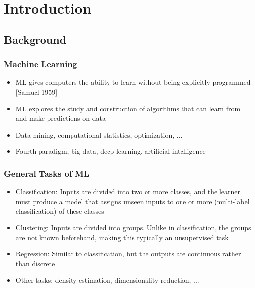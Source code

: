 
\section{Introduction}\label{sec:intro}

\subsection{Background}

\begin{frame}
  \MyLogo
  \frametitle{Machine Learning}  

\begin{itemize}

\item ML gives computers the ability to learn without being explicitly programmed {\footnotesize\color{DarkOrchid}[Samuel 1959]}

\item ML explores the study and construction of algorithms that can learn from and make predictions on data

\item Data mining, computational statistics, optimization, ...

\item Fourth paradigm, big data, deep learning, artificial intelligence 

\end{itemize}

\end{frame}


\begin{frame}
  \MyLogo
  \frametitle{General Tasks of ML}

\begin{itemize}

\item Classification: Inputs are divided into two or more classes, and the learner must produce a model that assigns unseen inputs to one or more (multi-label classification) of these classes

\item Clustering: Inputs are divided into groups. Unlike in classification, the groups are not known beforehand, making this typically an unsupervised task

\item Regression: Similar to classification, but the outputs are continuous rather than discrete

\item Other tasks: density estimation, dimensionality reduction, ...

\end{itemize}

\end{frame}

